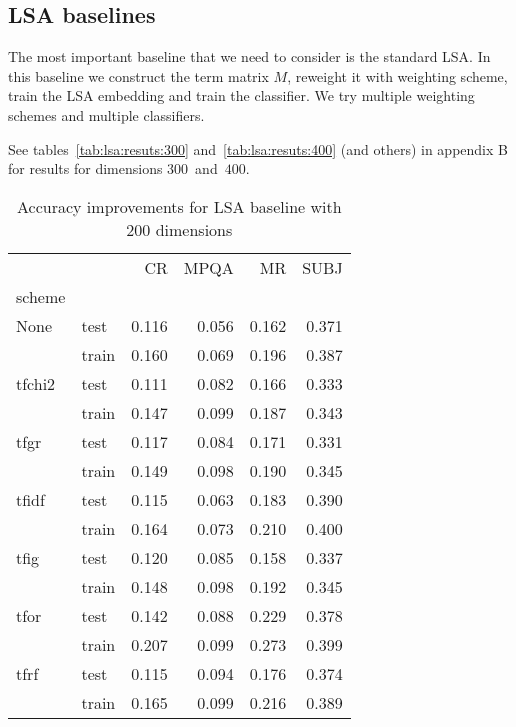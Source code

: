     \subsection{LSA baselines} \label{sec:lsa:baseline}
    The most important baseline that we need to consider is the standard LSA.
    In this baseline we construct the term matrix $M$, reweight it with weighting scheme, train the LSA embedding and train the classifier.
    We try multiple weighting schemes and multiple classifiers.
    
    See tables~\ref{tab:lsa:resuts:300} and~\ref{tab:lsa:resuts:400} (and others) in appendix B for results for dimensions $300$~and~$400$.
    
\begin{table}[H]
\begin{center}

\begin{tabular}{llrrrr}
\toprule
{} &      &  CR &  MPQA &  MR &  SUBJ \\
scheme &  &            &              &            &              \\
\midrule
None & test &      0.116 &        0.056 &      0.162 &        0.371 \\
{} & train &      0.160 &        0.069 &      0.196 &        0.387 \\
tfchi2 & test &      0.111 &        0.082 &      0.166 &        0.333 \\
{} & train &      0.147 &        0.099 &      0.187 &        0.343 \\
tfgr & test &      0.117 &        0.084 &      0.171 &        0.331 \\
{} & train &      0.149 &        0.098 &      0.190 &        0.345 \\
tfidf & test &      0.115 &        0.063 &      0.183 &        0.390 \\
{} & train &      0.164 &        0.073 &      0.210 &        0.400 \\
tfig & test &      0.120 &        0.085 &      0.158 &        0.337 \\
{} & train &      0.148 &        0.098 &      0.192 &        0.345 \\
tfor & test &      0.142 &        0.088 &      0.229 &        0.378 \\
{} & train &      0.207 &        0.099 &      0.273 &        0.399 \\
tfrf & test &      0.115 &        0.094 &      0.176 &        0.374 \\
{} & train &      0.165 &        0.099 &      0.216 &        0.389 \\
\bottomrule
\end{tabular}

\caption[Accuracy improvements for LSA baseline with 200 dimensions]{Accuracy improvements for LSA baseline with 200 dimensions}
\label{tab:lsa:resuts:200:main}
\end{center}
\end{table}
    
